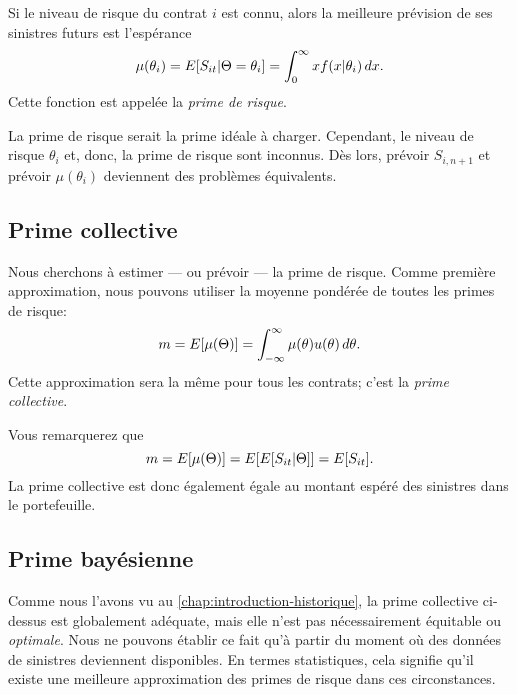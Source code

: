 Si le niveau de risque du contrat $i$ est connu, alors la meilleure
prévision de ses sinistres futurs est l'espérance
\begin{equation}
  \label{eq:bayesienne:prime_risque}
  \mu(\theta_i)
  = E [ S_{it}|\Theta = \theta_i ]
  = \int_0^\infty x f(x|\theta_i)\, dx.
\end{equation}
Cette fonction est appelée la \emph{prime de risque}.

La prime de risque serait la prime idéale à charger. Cependant, le
niveau de risque $\theta_i$ et, donc, la prime de risque sont
inconnus. Dès lors, prévoir $S_{i, n + 1}$ et prévoir $\mu(\theta_i)$
deviennent des problèmes équivalents.

\subsection{Prime collective}
\label{sec:bayesienne:prevision:collective}

Nous cherchons à estimer --- ou prévoir --- la prime de risque. Comme
première approximation, nous pouvons utiliser la moyenne pondérée de
toutes les primes de risque:
\begin{equation}
  \label{eq:bayesienne:prime_collective}
  m
  = E [ \mu(\Theta) ]
  = \int_{-\infty}^\infty \mu(\theta) u(\theta)\, d\theta.
\end{equation}
Cette approximation sera la même pour tous les contrats; c'est la
\emph{prime collective}.

Vous remarquerez que
\begin{equation*}
  m = E [ \mu(\Theta) ] = E [ E [ S_{it}|\Theta ] ] = E [ S_{it} ].
\end{equation*}
La prime collective est donc également égale au montant espéré des
sinistres dans le portefeuille.

\subsection{Prime bayésienne}
\label{sec:bayesienne:prevision:bayesienne}

Comme nous l'avons vu au \autoref{chap:introduction-historique}, la
prime collective ci-dessus est globalement adéquate, mais elle n'est
pas nécessairement équitable ou \emph{optimale}. Nous ne pouvons
établir ce fait qu'à partir du moment où des données de sinistres
deviennent disponibles. En termes statistiques, cela signifie qu'il
existe une meilleure approximation des primes de risque dans ces
circonstances.

